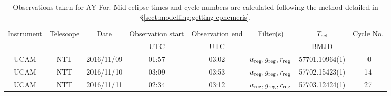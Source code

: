 \begin{table}
	\begin{center}
		\caption{Observations taken for AY For. Mid-eclipse times and cycle numbers are calculated following the method detailed in \S\ref{sect:modelling:getting ephemeris}.}
		\label{table:observing:observation logs AYFor}
		\begin{tabular}{cccccccc}
			\hline
			Instrument & Telescope & Date & Observation start & Observation end & Filter(s) & $T_{\rm ecl}$ & Cycle No. \\
			 &  &  & UTC & UTC &  & BMJD &  \\
			\hline
			\hline
			UCAM & NTT & 2016/11/09 & 01:57 & 03:02 & $u_{\rm reg},g_{\rm reg},r_{\rm reg}$ & 57701.10964(1)                                                                                                            &                                          -0 \\
			UCAM & NTT & 2016/11/10 & 03:09 & 03:53 & $u_{\rm reg},g_{\rm reg},r_{\rm reg}$ & 57702.15423(1)                                                                                                            &                                          14 \\
			UCAM & NTT & 2016/11/11 & 02:34 & 03:12 & $u_{\rm reg},g_{\rm reg},r_{\rm reg}$ & 57703.12424(1)                                                                                                            &                                          27 \\
		   \hline
		\end{tabular}
	\end{center}
\end{table}